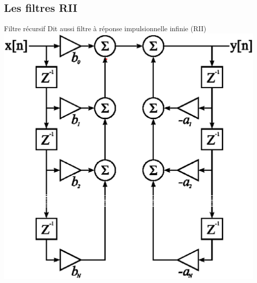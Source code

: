 \documentclass{beamer}
\begin{document}
\subsection{Les filtres RII}
\begin{frame}
\begin{block}{Filtre récursif} 
\justify Dit aussi filtre à réponse impulsionnelle infinie (RII)
\center
\includegraphics[scale=.25]{images/FiltreRII.eps}
\end{block}
\end{frame}
\end{document}
